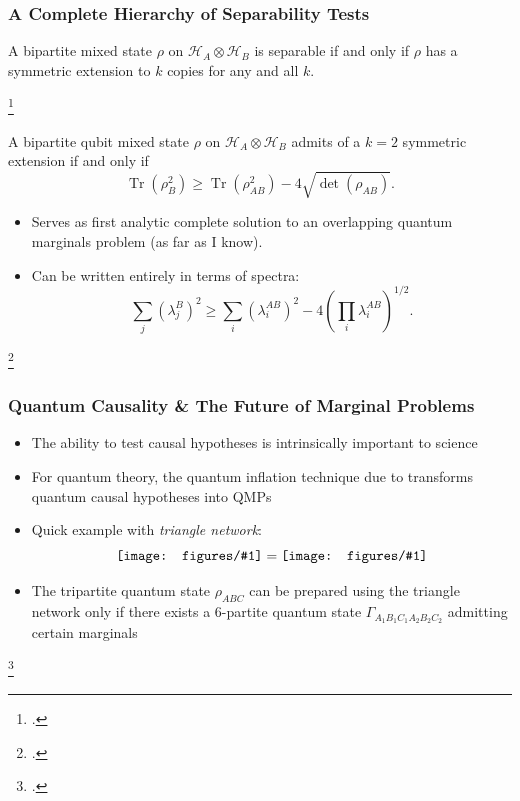 \documentclass[
    9pt,
    hyperref={bookmarks=false, colorlinks=false}, %
    xcolor={dvipsnames},
]{beamer}
\DeclareMathOperator{\Tr}{Tr}
\newcommand{\incstr}[1]{\vcenter{\hbox{\texttt{[image: figures/\#1]}}}} %
\begin{document}
\begin{frame}
    \frametitle{A Complete Hierarchy of Separability Tests}
    \begin{theorem}
        A bipartite mixed state $\rho$ on $\mathcal H_A \otimes \mathcal H_B$ is separable if and only if $\rho$ has a symmetric extension to $k$ copies for any and all $k$.
    \end{theorem}
    \footcitetext{doherty2004complete}
    \begin{theorem}
        A bipartite qubit mixed state $\rho$ on $\mathcal H_A \otimes \mathcal H_B$ admits of a $k=2$ symmetric extension if and only if
        \[ \Tr(\rho_{B}^2) \geq \Tr(\rho^2_{AB}) - 4 \sqrt{\det(\rho_{AB})}. \]
    \end{theorem}
    \begin{itemize}
        \item Serves as first analytic complete solution to an overlapping quantum marginals problem (as far as I know).
        \item Can be written entirely in terms of spectra:
        \[ {\sum}_{j}(\lambda_j^{B})^2 \geq {\sum}_{i}(\lambda_i^{AB})^2 - 4 \left({\prod}_{i} \lambda_i^{AB}\right)^{1/2}. \]
    \end{itemize}
    \footcitetext{chen2014symmetric}
\end{frame}

\begin{frame}
    \frametitle{Quantum Causality \& The Future of Marginal Problems}
    \begin{itemize}
        \item The ability to test causal hypotheses is intrinsically important to science
        \item For quantum theory, the quantum inflation technique due to \citeauthor{wolfe2019quantum}\footnotemark{} transforms quantum causal hypotheses into QMPs
        \item Quick example with \textit{triangle network}:
            \[ \incstr{triangle_state.pdf} = \incstr{triangle_production.pdf} \]
        \item The tripartite quantum state $\rho_{ABC}$ can be prepared using the triangle network only if there exists a $6$-partite quantum state $\Gamma_{A_1B_1C_1A_2B_2C_2}$ admitting certain marginals
    \end{itemize}
    \footcitetext{wolfe2019quantum}
\end{frame}
\end{document}
